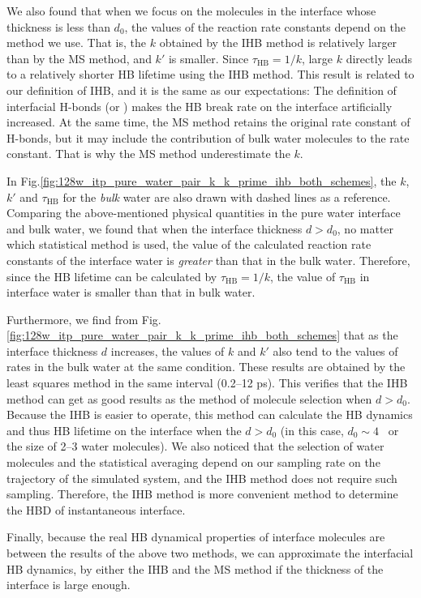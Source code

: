 We also found that when we focus on the molecules in the interface whose thickness is less than $d_0$, 
the values of the reaction rate constants depend on the method we use. 
That is, the $k$ obtained by the IHB method is relatively larger than by the MS method, and $k'$ is smaller. 
Since $\tau_\text{HB} = 1/k$, large $k$ directly leads to a relatively shorter HB lifetime using the IHB method. 
This result is related to our definition of IHB, and it is the same as our expectations: 
The definition of interfacial H-bonds (or \hbos) makes the HB break rate 
on the interface artificially increased. At the same time, the MS method retains the original rate constant of H-bonds, 
but it may include the contribution of bulk water molecules to the rate constant. 
That is why the MS method underestimate the $k$. 

In Fig.\thinspace\ref{fig:128w_itp_pure_water_pair_k_k_prime_ihb_both_schemes}, the $k$, $k'$ and $\tau_\text{HB}$ for the \emph{bulk} water 
are also drawn with dashed lines as a reference.
Comparing the above-mentioned physical quantities in the pure water interface and bulk water, 
we found that when the interface thickness $d>d_0$, 
no matter which statistical method is used, the value of the calculated reaction rate constants of the interface water is \emph{greater} than that in the bulk water. 
Therefore, since the HB lifetime can be calculated by $\tau_\text{HB} = 1/k$, the value of $\tau_\text{HB}$ in interface water is smaller than that in bulk water.

Furthermore, we find from Fig.\thinspace\ref{fig:128w_itp_pure_water_pair_k_k_prime_ihb_both_schemes} that as the interface thickness $d$ increases, 
the values of $k$ and $k'$ also tend to the values of rates in the bulk water at the same condition.
These results are obtained by the least squares method in the same interval (0.2--12 ps). This verifies that the IHB method 
can get as good results as the method of molecule selection  when $d>d_0$. 
Because the IHB is easier to operate, this method can calculate the HB dynamics and thus HB lifetime on the interface 
when the $d>d_0$ (in this case, $d_0 \sim 4$ \A \ or the size of 2--3 water molecules).
We also noticed that the selection of water molecules and the statistical averaging depend on our sampling rate on the trajectory of the simulated system, 
and the IHB method does not require such sampling. Therefore, the IHB method is more convenient method to determine the HBD of instantaneous interface.

Finally, because the real HB dynamical properties of interface molecules are between the results of the above two methods, 
we can approximate the interfacial HB dynamics, by either the IHB and the MS method if the thickness of the interface is large enough. 

